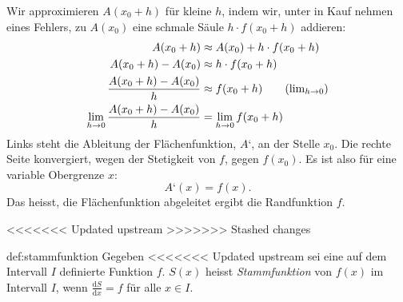 \documentclass[%
<<<<<<< Updated upstream
<<<<<<< Updated upstream
11pt,%
twoside,%
titlepage,%
german,%
headsepline%
]{scrartcl}
\begin{document}
\begin{center}
\end{center}

Wir approximieren $A(x_0+h)$ für kleine $h$, indem wir, unter in Kauf nehmen eines Fehlers, zu $A(x_0)$ eine schmale Säule $h\cdot f(x_0+h)$ addieren:
\begin{align*}
     A(x_0+h) &\approx A(x_0)+h\cdot f(x_0+h)\\ 
     A(x_0+h) - A(x_0) &\approx h\cdot f(x_0+h)\\ 
     \frac{A(x_0+h) - A(x_0)}{h} &\approx f(x_0+h)\tag{$\lim_{h\to0}$}\\ 
     \lim_{h\to0}\frac{A(x_0+h) - A(x_0)}{h} &= \lim_{h\to0}f(x_0+h)
\end{align*}
Links steht die Ableitung der Flächenfunktion, $A‘$, an der Stelle $x_0$. Die rechte Seite konvergiert, wegen der Stetigkeit von $f$, gegen $f(x_0)$. Es ist also für eine variable Obergrenze $x$:
$$A‘(x)=f(x).$$
Das heisst, die Flächenfunktion abgeleitet ergibt die Randfunktion $f$.

<<<<<<< Updated upstream
>>>>>>> Stashed changes
\begin{cdef}[Stammfunktion]{def:stammfunktion}
Gegeben
<<<<<<< Updated upstream
sei eine auf dem Intervall $I$ definierte Funktion $f$. $S(x)$ heisst \emph{Stammfunktion} von $f(x)$ im Intervall $I$, wenn $\frac{\mathrm{d}S}{\mathrm{d}x}=f$ für alle $x\in I$.
\end{cdef}
\end{document}
